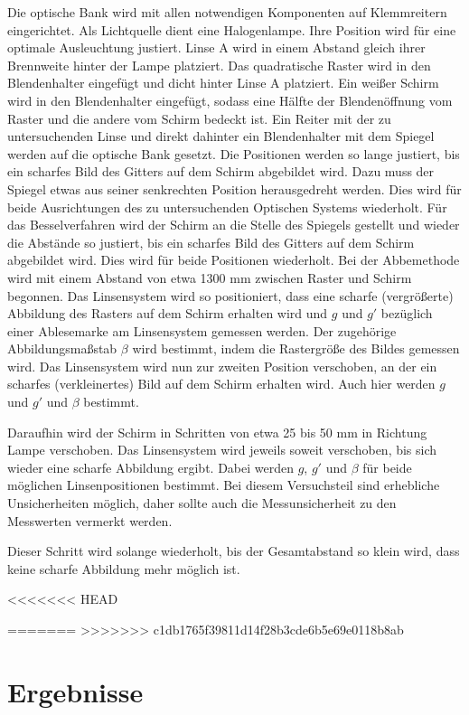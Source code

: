 \documentclass[11pt, a4paper]{article}
\begin{document}
    Die optische Bank wird mit allen notwendigen Komponenten auf Klemmreitern eingerichtet. Als Lichtquelle dient eine Halogenlampe. Ihre Position wird für eine optimale Ausleuchtung justiert. Linse A wird in einem Abstand gleich ihrer Brennweite hinter der Lampe platziert. Das quadratische Raster wird in den Blendenhalter eingefügt und dicht hinter Linse A platziert. Ein weißer Schirm wird in den Blendenhalter eingefügt, sodass eine Hälfte der Blendenöffnung vom Raster und die andere vom Schirm bedeckt ist. Ein Reiter mit der zu untersuchenden Linse und direkt dahinter ein Blendenhalter mit dem Spiegel werden auf die optische Bank gesetzt. Die Positionen werden so lange justiert, bis ein scharfes Bild des Gitters auf dem Schirm abgebildet wird. Dazu muss der Spiegel etwas aus seiner senkrechten Position herausgedreht werden. Dies wird für beide Ausrichtungen des zu untersuchenden Optischen Systems wiederholt.
    Für das Besselverfahren wird der Schirm an die Stelle des Spiegels gestellt und wieder die Abstände so justiert, bis ein scharfes Bild des Gitters auf dem Schirm abgebildet wird. Dies wird für beide Positionen wiederholt.
    Bei der Abbemethode wird mit einem Abstand von etwa 1300 mm zwischen Raster und Schirm begonnen. Das Linsensystem wird so positioniert, dass eine scharfe (vergrößerte) Abbildung des Rasters auf dem Schirm erhalten wird und $g$ und $g'$ bezüglich einer Ablesemarke am Linsensystem gemessen werden. Der zugehörige Abbildungsmaßstab $\beta$ wird bestimmt, indem die Rastergröße des Bildes gemessen wird. Das Linsensystem wird nun zur zweiten Position verschoben, an der ein scharfes (verkleinertes) Bild auf dem Schirm erhalten wird. Auch hier werden $g$ und $g'$ und $\beta$ bestimmt.

    Daraufhin wird der Schirm in Schritten von etwa 25 bis 50 mm in Richtung Lampe verschoben. Das Linsensystem wird jeweils soweit verschoben, bis sich wieder eine scharfe Abbildung ergibt. Dabei werden $g$, $g'$ und $\beta$ für beide möglichen Linsenpositionen bestimmt. Bei diesem Versuchsteil sind erhebliche Unsicherheiten möglich, daher sollte auch die Messunsicherheit zu den Messwerten vermerkt werden.

    Dieser Schritt wird solange wiederholt, bis der Gesamtabstand so klein wird, dass keine scharfe Abbildung mehr möglich ist.


<<<<<<< HEAD

=======
>>>>>>> c1db1765f39811d14f28b3cde6b5e69e0118b8ab
    \section{Ergebnisse}
\end{document}
